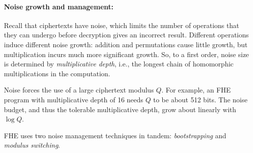 



\paragraph{Noise growth and management:}
Recall that ciphertexts have noise, which limits the number of
operations that they can undergo before decryption gives an incorrect
result.  Different operations induce different noise growth: addition
and permutations cause little growth, but multiplication incurs much
more significant growth.  So, to a first order, noise size is
determined by \emph{multiplicative depth},
i.e., the longest chain of homomorphic multiplications
in the computation.

Noise forces the use of a large ciphertext modulus $Q$.
For example, an FHE program with multiplicative depth of 16
needs $Q$ to be about 512 bits.  The noise budget, and
thus the tolerable multiplicative depth, grow about linearly with~$\log Q$.

FHE uses two noise management techniques in tandem:
\emph{bootstrapping} and \emph{modulus switching}.

